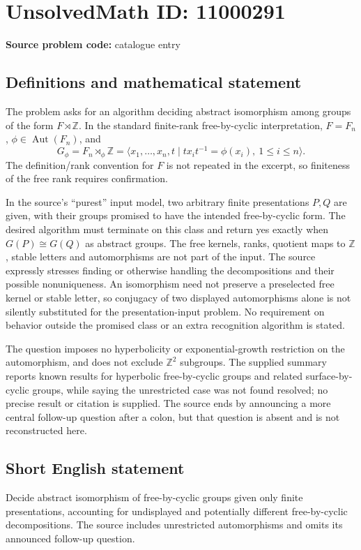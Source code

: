 \documentclass[11pt]{article}
\newcommand{\Z}{\mathbb{Z}}
\begin{document}
\section*{UnsolvedMath ID: 11000291}
\textbf{Source problem code:} catalogue entry
\subsection{Definitions and mathematical statement}
The problem asks for an algorithm deciding abstract isomorphism among groups of the form \(F\rtimes\Z\). In the standard finite-rank free-by-cyclic interpretation, \(F=F_n\), \(\phi\in\operatorname{Aut}(F_n)\), and
\[G_\phi=F_n\rtimes_\phi\Z
=\langle x_1,\ldots,x_n,t\mid t x_i t^{-1}=\phi(x_i),\ 1\leq i\leq n\rangle.\]
The definition/rank convention for \(F\) is not repeated in the excerpt, so finiteness of the free rank requires confirmation.

In the source's ``purest'' input model, two arbitrary finite presentations \(P,Q\) are given, with their groups promised to have the intended free-by-cyclic form. The desired algorithm must terminate on this class and return yes exactly when \(G(P)\cong G(Q)\) as abstract groups. The free kernels, ranks, quotient maps to \(\Z\), stable letters and automorphisms are not part of the input. The source expressly stresses finding or otherwise handling the decompositions and their possible nonuniqueness. An isomorphism need not preserve a preselected free kernel or stable letter, so conjugacy of two displayed automorphisms alone is not silently substituted for the presentation-input problem. No requirement on behavior outside the promised class or an extra recognition algorithm is stated.

The question imposes no hyperbolicity or exponential-growth restriction on the automorphism, and does not exclude \(\Z^2\) subgroups. The supplied summary reports known results for hyperbolic free-by-cyclic groups and related surface-by-cyclic groups, while saying the unrestricted case was not found resolved; no precise result or citation is supplied. The source ends by announcing a more central follow-up question after a colon, but that question is absent and is not reconstructed here.
\subsection{Short English statement}
Decide abstract isomorphism of free-by-cyclic groups given only finite presentations, accounting for undisplayed and potentially different free-by-cyclic decompositions. The source includes unrestricted automorphisms and omits its announced follow-up question.
\end{document}

